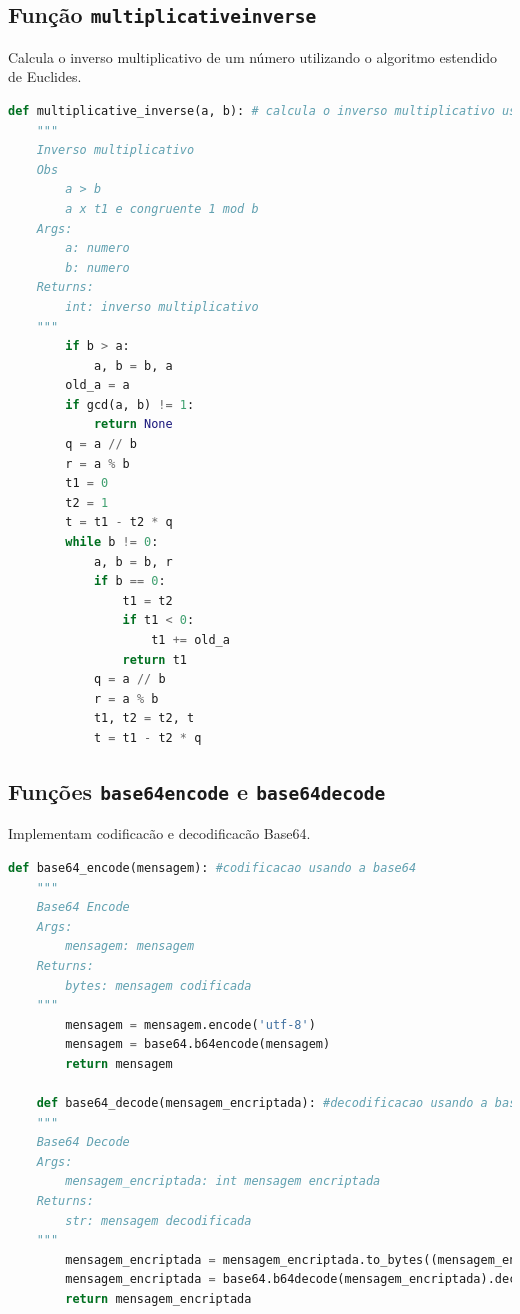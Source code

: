 \documentclass{article}
\begin{document}
\subsection{Função \texttt{multiplicative\textunderscore inverse}}
Calcula o inverso multiplicativo de um número utilizando o algoritmo estendido de Euclides.

\begin{lstlisting}[language=Python]
    def multiplicative_inverse(a, b): # calcula o inverso multiplicativo usando o Algoritmo extendido de Euclides
    """
    Inverso multiplicativo
    Obs
        a > b
        a x t1 e congruente 1 mod b
    Args:
        a: numero
        b: numero
    Returns:
        int: inverso multiplicativo
    """
        if b > a:
            a, b = b, a
        old_a = a                                       
        if gcd(a, b) != 1:                              
            return None
        q = a // b
        r = a % b
        t1 = 0
        t2 = 1
        t = t1 - t2 * q
        while b != 0:
            a, b = b, r
            if b == 0:
                t1 = t2
                if t1 < 0:
                    t1 += old_a
                return t1
            q = a // b
            r = a % b
            t1, t2 = t2, t
            t = t1 - t2 * q
    \end{lstlisting}

\subsection{Funções \texttt{base64\textunderscore encode} e \texttt{base64\textunderscore decode}}
Implementam codificacão e decodificacão Base64.

\begin{lstlisting}[language=Python]
    def base64_encode(mensagem): #codificacao usando a base64
    """
    Base64 Encode
    Args:
        mensagem: mensagem
    Returns:
        bytes: mensagem codificada
    """
        mensagem = mensagem.encode('utf-8')
        mensagem = base64.b64encode(mensagem)
        return mensagem

    def base64_decode(mensagem_encriptada): #decodificacao usando a base64
    """
    Base64 Decode
    Args:
        mensagem_encriptada: int mensagem encriptada
    Returns:
        str: mensagem decodificada
    """
        mensagem_encriptada = mensagem_encriptada.to_bytes((mensagem_encriptada.bit_length() + 7) // 8, byteorder='big')
        mensagem_encriptada = base64.b64decode(mensagem_encriptada).decode('utf-8')
        return mensagem_encriptada
    \end{lstlisting}
\end{document}
